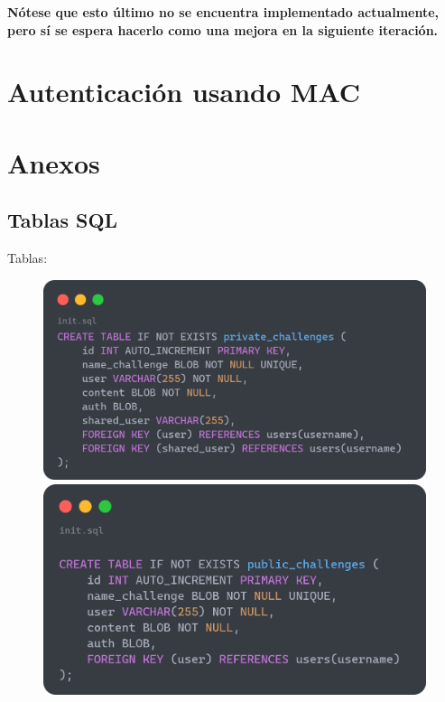 \documentclass[a4paper,11pt]{article}
\begin{document}
\textbf{Nótese que esto último no se encuentra implementado actualmente, pero sí se espera hacerlo como una mejora en la siguiente iteración.}

\section{Autenticación usando MAC}

\section{Anexos}
\subsection{Tablas SQL}
    \label{sec:TablasSQL}
    Tablas:
    \begin{figure}[htbp]
        \centering
        \begin{minipage}[t]{0.48\textwidth} %
            \centering
            \includegraphics[width=\textwidth]{images/privateChallenge.png}
        \end{minipage}
        \hfill
        \begin{minipage}[t]{0.48\textwidth} %
            \centering
            \includegraphics[width=\textwidth]{images/publicChallenge.png}

\end{minipage}
\end{figure}
\end{document}

